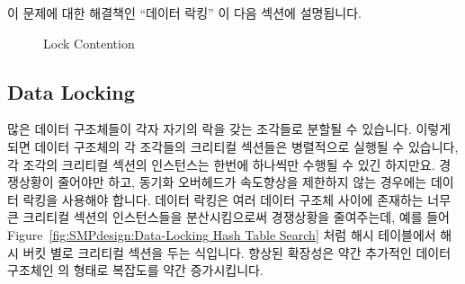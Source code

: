 이 문제에 대한 해결책인 ``데이터 락킹'' 이 다음 섹션에 설명됩니다.

\begin{figure}[htb]
\begin{center}
\end{center}
\caption{Lock Contention}
\end{figure}

\subsection{Data Locking}
\label{sec:SMPdesign:Data Locking}

많은 데이터 구조체들이 각자 자기의 락을 갖는 조각들로 분할될 수 있습니다.
이렇게 되면 데이터 구조체의 각 조각들의 크리티컬 섹션들은 병렬적으로 실행될 수
있습니다, 각 조각의 크리티컬 섹션의 인스턴스는 한번에 하나씩만 수행될 수 있긴
하지만요.
경쟁상황이 줄어야만 하고, 동기화 오버헤드가 속도향상을 제한하지 않는 경우에는
데이터 락킹을 사용해야 합니다.
데이터 락킹은 여러 데이터 구조체 사이에 존재하는 너무 큰 크리티컬 섹션의
인스턴스들을 분산시킴으로써 경쟁상황을 줄여주는데, 예를 들어
Figure~\ref{fig:SMPdesign:Data-Locking Hash Table Search} 처럼 해시 테이블에서
해시 버킷 별로 크리티컬 섹션을 두는 식입니다.
향상된 확장성은 약간 추가적인 데이터 구조체인  의 형태로
복잡도를 약간 증가시킵니다.
\iffalse

